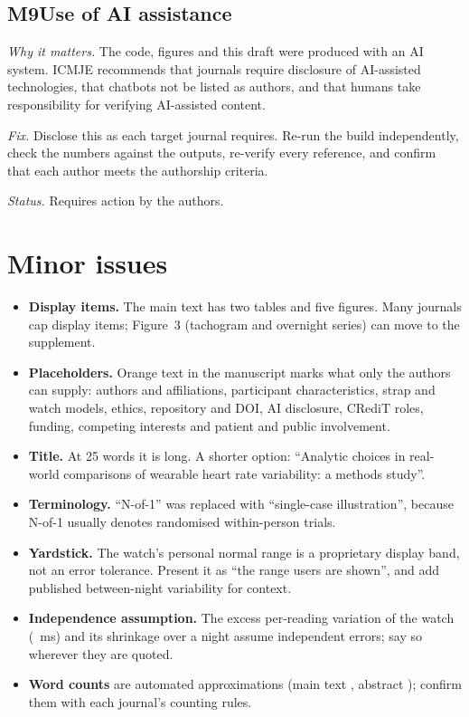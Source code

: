 \documentclass[11pt,a4paper]{article}
\newcommand{\issue}[5]{%
  \needspace{6\baselineskip}%
  \subsection*{#1\quad #2}
  \textit{Why it matters.} #3\par
  \textit{Fix.} #4\par
  \textit{Status.} #5\par}
\begin{document}
\issue{M9}{Use of AI assistance}
{The code, figures and this draft were produced with an AI system. ICMJE recommends that journals require disclosure of AI-assisted technologies, that chatbots not be listed as authors, and that humans take responsibility for verifying AI-assisted content.\autocite{icmje}}
{Disclose this as each target journal requires. Re-run the build independently, check the numbers against the outputs, re-verify every reference, and confirm that each author meets the authorship criteria.}
{Requires action by the authors.}

\section{Minor issues}
\begin{itemize}
\item \textbf{Display items.} The main text has two tables and five figures. Many journals cap display items; Figure~3 (tachogram and overnight series) can move to the supplement.
\item \textbf{Placeholders.} Orange text in the manuscript marks what only the authors can supply: authors and affiliations, participant characteristics, strap and watch models, ethics, repository and DOI, AI disclosure, CRediT roles, funding, competing interests and patient and public involvement.
\item \textbf{Title.} At 25 words it is long. A shorter option: ``Analytic choices in real-world comparisons of wearable heart rate variability: a methods study''.
\item \textbf{Terminology.} ``N-of-1'' was replaced with ``single-case illustration'', because N-of-1 usually denotes randomised within-person trials.\autocite{vohra2015}
\item \textbf{Yardstick.} The watch's personal normal range is a proprietary display band, not an error tolerance. Present it as ``the range users are shown'', and add published between-night variability for context.\autocite{herzig2018}
\item \textbf{Independence assumption.} The excess per-reading variation of the watch (\watchExcessSD{}~ms) and its shrinkage over a night assume independent errors; say so wherever they are quoted.
\item \textbf{Word counts} are automated approximations (main text \wordsMain, abstract \wordsAbstract); confirm them with each journal's counting rules.
\end{itemize}
\end{document}
